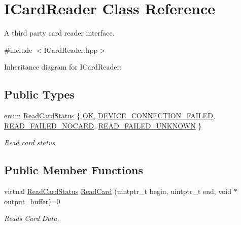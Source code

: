 \hypertarget{classICardReader}{}\section{I\+Card\+Reader Class Reference}
\label{classICardReader}


A third party card reader interface.  




{\ttfamily \#include $<$I\+Card\+Reader.\+hpp$>$}



Inheritance diagram for I\+Card\+Reader\+:
\subsection*{Public Types}
\begin{DoxyCompactItemize}
\item 
enum \hyperlink{classICardReader_a3b289f13ac2a90f46950289aafb551a9}{Read\+Card\+Status} \{ \hyperlink{classICardReader_a3b289f13ac2a90f46950289aafb551a9a95f57da1a6edeca38313d3890a5042b1}{OK}, 
\hyperlink{classICardReader_a3b289f13ac2a90f46950289aafb551a9a3d6dd451ad843c8def4efb5aeb9cb0c3}{D\+E\+V\+I\+C\+E\+\_\+\+C\+O\+N\+N\+E\+C\+T\+I\+O\+N\+\_\+\+F\+A\+I\+L\+ED}, 
\hyperlink{classICardReader_a3b289f13ac2a90f46950289aafb551a9a83eadef5a734515fab8b56ef0407e388}{R\+E\+A\+D\+\_\+\+F\+A\+I\+L\+E\+D\+\_\+\+N\+O\+C\+A\+RD}, 
\hyperlink{classICardReader_a3b289f13ac2a90f46950289aafb551a9af747871097d8b51e57e1b29fb5003093}{R\+E\+A\+D\+\_\+\+F\+A\+I\+L\+E\+D\+\_\+\+U\+N\+K\+N\+O\+WN}
 \}\begin{DoxyCompactList}\small\item\em Read card status. \end{DoxyCompactList}
\end{DoxyCompactItemize}
\subsection*{Public Member Functions}
\begin{DoxyCompactItemize}
\item 
virtual \hyperlink{classICardReader_a3b289f13ac2a90f46950289aafb551a9}{Read\+Card\+Status} \hyperlink{classICardReader_a6f94003b973662f97c16a19052a8984d}{Read\+Card} (uintptr\+\_\+t begin, uintptr\+\_\+t end, void $\ast$output\+\_\+buffer)=0
\begin{DoxyCompactList}\small\item\em Reads Card Data. \end{DoxyCompactList}\end{DoxyCompactItemize}



